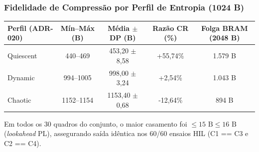 \begin{frame}
  \frametitle{Fidelidade de Compress\~ao por Perfil de Entropia (1024 B)}
  \scriptsize
  \renewcommand{\arraystretch}{1.2}
  \begin{tabular}{@{}lcccc@{}}
    \toprule
    \textbf{Perfil (ADR-020)} & \textbf{M\'in--M\'ax (B)} & \textbf{M\'edia $\pm$ DP (B)} & \textbf{Raz\~ao CR (\%)} & \textbf{Folga BRAM (2048 B)}\\
    \midrule
    Quiescent & 440--469 & 453,20 $\pm$ 8,58 & +55,74\% & 1.579 B\\
    Dynamic & 994--1005 & 998,00 $\pm$ 3,24 & +2,54\% & 1.043 B\\
    Chaotic & 1152--1154 & 1153,40 $\pm$ 0,68 & -12,64\% & 894 B\\
    \bottomrule
  \end{tabular}
  \par\vspace{1.2ex}
  \begin{pontoschave}
    \small Em todos os 30 quadros do conjunto, o maior casamento foi $\le 15\text{ B} \le 16\text{ B}$ (\textit{lookahead} PL), assegurando sa\'ida id\^entica nos 60/60 ensaios HIL (C1 == C3 e C2 == C4).
  \end{pontoschave}
\end{frame}
